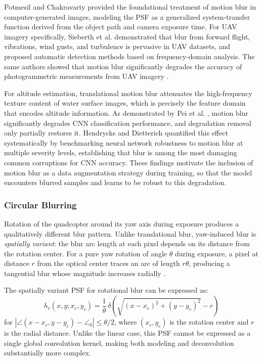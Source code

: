     Potmesil and Chakravarty \cite{Potmesil1983} provided the foundational treatment of motion blur in computer-generated images, modeling the PSF as a generalized system-transfer function derived from the object path and camera exposure time. For UAV imagery specifically, Sieberth et al. \cite{Sieberth2016} demonstrated that blur from forward flight, vibrations, wind gusts, and turbulence is pervasive in UAV datasets, and proposed automatic detection methods based on frequency-domain analysis. The same authors showed that motion blur significantly degrades the accuracy of photogrammetric measurements from UAV imagery \cite{Sieberth2014}.

    For altitude estimation, translational motion blur attenuates the high-frequency texture content of water surface images, which is precisely the feature domain that encodes altitude information. As demonstrated by Pei et al. \cite{Pei2021}, motion blur significantly degrades CNN classification performance, and degradation removal only partially restores it. Hendrycks and Dietterich \cite{Hendrycks2019} quantified this effect systematically by benchmarking neural network robustness to motion blur at multiple severity levels, establishing that blur is among the most damaging common corruptions for CNN accuracy. These findings motivate the inclusion of motion blur as a data augmentation strategy during training, so that the model encounters blurred samples and learns to be robust to this degradation.

    \subsubsection{Circular Blurring}

    Rotation of the quadcopter around its yaw axis during exposure produces a qualitatively different blur pattern. Unlike translational blur, yaw-induced blur is \emph{spatially variant}: the blur arc length at each pixel depends on its distance from the rotation center. For a pure yaw rotation of angle $\theta$ during exposure, a pixel at distance $r$ from the optical center traces an arc of length $r\theta$, producing a tangential blur whose magnitude increases radially \cite{Whyte2012}.

    The spatially variant PSF for rotational blur can be expressed as:
    \begin{equation}
        h_r(x, y; x_c, y_c) = \frac{1}{\theta} \, \delta\!\left(\sqrt{(x-x_c)^2 + (y-y_c)^2} - r\right)
        \label{eq:rotational_psf}
    \end{equation}
    for $|\angle(x-x_c, y-y_c) - \angle_0| \leq \theta/2$, where $(x_c, y_c)$ is the rotation center and $r$ is the radial distance. Unlike the linear case, this PSF cannot be expressed as a single global convolution kernel, making both modeling and deconvolution substantially more complex.


